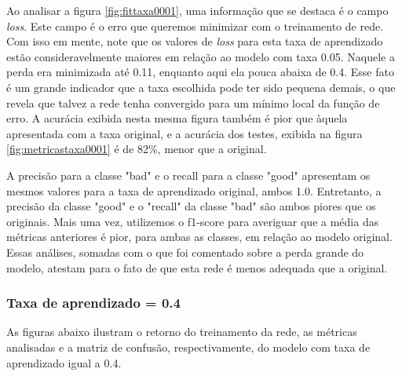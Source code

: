 \documentclass[12pt]{article}
\begin{document}
Ao analisar a figura \ref{fig:fittaxa0001}, uma informação que se destaca é o campo \textit{loss}. Este campo é o erro que queremos minimizar com o treinamento de rede. Com isso em mente, note que os valores de \textit{loss} para esta taxa de aprendizado estão consideravelmente maiores em relação ao modelo com taxa 0.05. Naquele a perda era minimizada até 0.11, enquanto aqui ela pouca abaixa de 0.4. Esse fato é um grande indicador que a taxa escolhida pode ter sido pequena demais, o que revela que talvez a rede tenha convergido para um mínimo local da função de erro. A acurácia exibida nesta mesma figura também é pior que àquela apresentada com a taxa original, e a acurácia dos testes, exibida na figura \ref{fig:metricastaxa0001} é de 82\%, menor que a original.

A precisão para a classe "bad" e o recall para a classe "good" apresentam os mesmos valores para a taxa de aprendizado original, ambos 1.0. Entretanto, a precisão da classe "good" e o "recall" da classe "bad" são ambos piores que os originais. Mais uma vez, utilizemos o f1-score para averiguar que a média das métricas anteriores é pior, para ambas as classes, em relação ao modelo original. Essas análises, somadas com o que foi comentado sobre a perda grande do modelo, atestam para o fato de que esta rede é menos adequada que a original. 
\subsubsection{Taxa de aprendizado = 0.4}

As figuras abaixo ilustram o retorno do treinamento da rede, as métricas analisadas e a matriz de confusão, respectivamente, do modelo com taxa de aprendizado igual a 0.4. 
\end{document}
